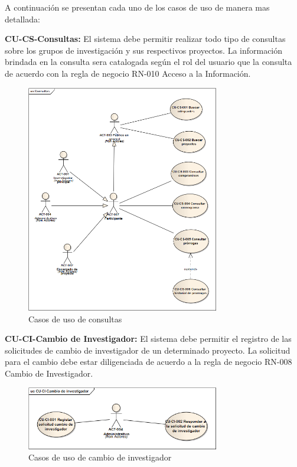 \documentclass[12pt,oneside,letterpaper]{report}
\begin{document}
\maketitle A continuación se presentan cada uno de los casos de uso de manera mas detallada:

\textbf{CU-CS-Consultas:}
El sistema debe permitir realizar todo tipo de consultas sobre los grupos de investigación y sus respectivos proyectos. La información brindada en la consulta sera catalogada según el rol del usuario que la consulta de acuerdo con la regla de negocio RN-010 Acceso a la Información.

\begin{figure}[h!]
  \centering
    \includegraphics[width=0.75\textwidth]{./img/img2.png}
  \caption{Casos de uso de consultas}
\end{figure}

\textbf{CU-CI-Cambio de Investigador:}
El sistema debe permitir el registro de las solicitudes de cambio de investigador de un determinado proyecto. La solicitud para el cambio debe estar diligenciada de acuerdo a la regla de negocio RN-008 Cambio de Investigador.

\begin{figure}[h!]
  \centering
    \includegraphics[width=0.75\textwidth]{./img/img3.png}
  \caption{Casos de uso de cambio de investigador}
\end{figure}
\end{document}
